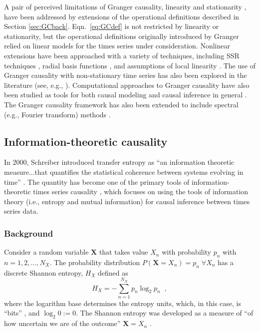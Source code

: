 \documentclass{article}[10pt]
\begin{document}
A pair of perceived limitations of Granger causality, linearity and stationarity \cite{He2001}, have been addressed by extensions of the operational definitions described in Section \ref{sec:GCback}.  Eqn.\ \ref{eq:GCdef} is not restricted by linearity or stationarity, but the operational definitions originally introduced by Granger relied on linear models for the times series under consideration.  Nonlinear extensions have been approached with a variety of techniques, including SSR techniques \cite{Chen2004}, radial basis functions \cite{Ancona2004}, and assumptions of local linearity \cite{Freiwald1999}.   The use of Granger causality with non-stationary time series has also been explored in the literature (see, e.g., \cite{Hesse2003,Kaminski2001,Barnett2015}).  Computational approaches to Granger causality have also been studied as tools for both causal modeling \cite{Arnold2007} and causal inference in general \cite{Shojaie2010,Lozano2009}.  The Granger causality framework has also been extended to include spectral (e.g., Fourier transform) methods \cite{Dhamala2008}.

\subsection{Information-theoretic causality}
\label{sec:TE}
In 2000, Schreiber introduced transfer entropy as ``an information theoretic measure$\ldots$that quantifies the statistical coherence between systems evolving in time'' \cite{Schreiber2000}.  The quantity has become one of the primary tools of information-theoretic times series causality \cite{Schindler2007,Kaiser2002}, which focuses on using the tools of information theory (i.e., entropy and mutual information) for causal inference between times series data.  

\subsubsection{Background}
Consider a random variable $\mathbf{X}$ that takes value $X_n$ with probability $p_n$ with $n = 1,2,\ldots,N_X$.  The probability distribution $P(\mathbf{X}=X_n) = p_n\;\forall X_n$ has a discrete Shannon entropy, $H_X$ defined as
\begin{equation}
H_X = -\sum_{n=1}^{N_X} p_n \log_2 p_n\;\;,
\end{equation}
where the logarithm base determines the entropy units, which, in this case, is ``bits'' \cite{Shannon1948,Schreiber2000,Schindler2007,Kaiser2002}, and $\log_2 0:= 0$.  The Shannon entropy was developed as a measure of ``of how uncertain we are of the outcome'' $\mathbf{X}=X_n$ \cite{Shannon1948}.
\end{document}
